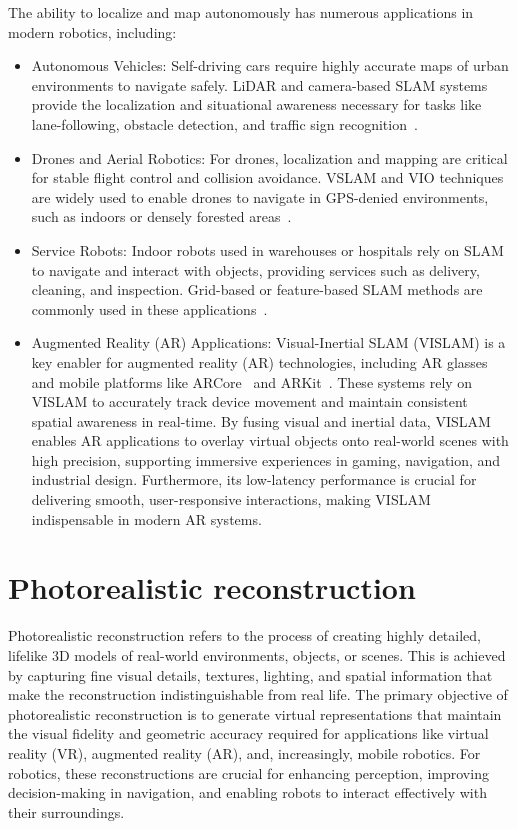 The ability to localize and map autonomously has numerous applications in modern robotics, including:
\begin{itemize}
    \item Autonomous Vehicles: Self-driving cars require highly accurate maps of urban environments to navigate safely. LiDAR and camera-based SLAM systems provide the localization and situational awareness necessary for tasks like lane-following, obstacle detection, and traffic sign recognition~\cite{slam_for_autonomous_driving}.
    \item Drones and Aerial Robotics: For drones, localization and mapping are critical for stable flight control and collision avoidance. VSLAM and VIO techniques are widely used to enable drones to navigate in GPS-denied environments, such as indoors or densely forested areas~\cite{d2slam}.
    \item Service Robots: Indoor robots used in warehouses or hospitals rely on SLAM to navigate and interact with objects, providing services such as delivery, cleaning, and inspection. Grid-based or feature-based SLAM methods are commonly used in these applications~\cite{slam_for_service_robots}.
    \item Augmented Reality (AR) Applications: Visual-Inertial SLAM (VISLAM) is a key enabler for augmented reality (AR) technologies, including AR glasses and mobile platforms like ARCore~\cite{arcore} and ARKit~\cite{arkit}. These systems rely on VISLAM to accurately track device movement and maintain consistent spatial awareness in real-time. By fusing visual and inertial data, VISLAM enables AR applications to overlay virtual objects onto real-world scenes with high precision, supporting immersive experiences in gaming, navigation, and industrial design. Furthermore, its low-latency performance is crucial for delivering smooth, user-responsive interactions, making VISLAM indispensable in modern AR systems.
\end{itemize}


\section{Photorealistic reconstruction}

Photorealistic reconstruction refers to the process of creating highly detailed, lifelike 3D models of real-world environments, objects, or scenes. This is achieved by capturing fine visual details, textures, lighting, and spatial information that make the reconstruction indistinguishable from real life. The primary objective of photorealistic reconstruction is to generate virtual representations that maintain the visual fidelity and geometric accuracy required for applications like virtual reality (VR), augmented reality (AR), and, increasingly, mobile robotics. For robotics, these reconstructions are crucial for enhancing perception, improving decision-making in navigation, and enabling robots to interact effectively with their surroundings.

